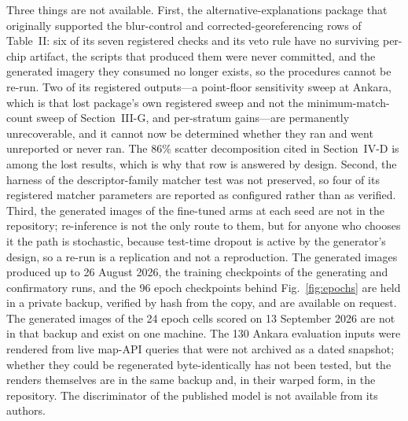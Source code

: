 Three things are not available. First, the
alternative-explanations package that originally supported the blur-control and
corrected-georeferencing rows of Table~II: six of its seven registered checks and its veto
rule have no surviving per-chip artifact, the scripts that produced them were never
committed, and the generated imagery they consumed no longer exists, so the procedures
cannot be re-run. Two of its registered outputs---a point-floor sensitivity sweep at Ankara, which is that
lost package's own registered sweep and not the minimum-match-count sweep of
Section~III-G, and per-stratum gains---are permanently unrecoverable, and it cannot now be determined
whether they ran and went unreported or never ran. The 86\% scatter decomposition cited in
Section~IV-D is among the lost results, which is why that row is answered by design. Second,
the harness of the descriptor-family matcher test was not preserved, so four of its
registered matcher parameters are reported as configured rather than as verified. Third, the generated images of the fine-tuned arms at each seed are not in the repository;
re-inference is not the only route to them, but for anyone who chooses it the path is
stochastic, because test-time dropout is active by the generator's design, so a re-run is a
replication and not a reproduction. The generated images produced up to 26 August 2026, the training checkpoints of the
generating and confirmatory runs, and the 96 epoch checkpoints behind Fig.~\ref{fig:epochs} are held in
a private backup, verified by hash from the copy, and are available on request. The
generated images of the 24 epoch cells scored on 13 September 2026 are not in that backup and exist on one machine.
The 130 Ankara evaluation inputs were rendered from live map-API queries that were not
archived as a dated snapshot; whether they could be regenerated byte-identically has not
been tested, but the renders themselves are in the same backup and, in their warped form,
in the repository. The discriminator of the published
model is not available from its authors.
